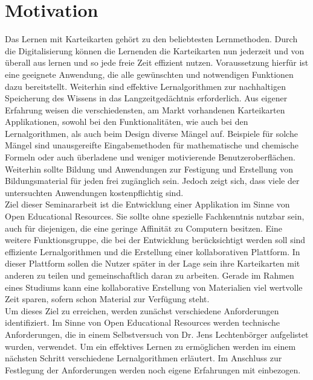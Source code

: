 %
%

\section{Motivation}
Das Lernen mit Karteikarten gehört zu den beliebtesten Lernmethoden. Durch die Digitalisierung können die Lernenden die Karteikarten nun jederzeit und von überall aus lernen und so jede freie Zeit effizient nutzen. Voraussetzung hierfür ist eine geeignete Anwendung, die alle gewünschten und notwendigen Funktionen dazu bereitstellt. Weiterhin sind effektive Lernalgorithmen zur nachhaltigen Speicherung des Wissens in das Langzeitgedächtnis erforderlich. Aus eigener Erfahrung weisen die verschiedensten, am Markt vorhandenen Karteikarten Applikationen, sowohl bei den Funktionalitäten, wie auch bei den Lernalgorithmen, als auch beim Design diverse Mängel auf. Beispiele für solche Mängel sind unausgereifte Eingabemethoden für mathematische und chemische Formeln oder auch überladene und weniger motivierende Benutzeroberflächen. Weiterhin sollte Bildung und Anwendungen zur Festigung und Erstellung von Bildungsmaterial für jeden frei zugänglich sein. Jedoch zeigt sich, dass viele der untersuchten Anwendungen kostenpflichtig sind.\\

Ziel dieser Seminararbeit ist die Entwicklung einer Applikation im Sinne von Open Educational Resources. Sie sollte ohne spezielle Fachkenntnis nutzbar sein, auch für diejenigen, die eine geringe Affinität zu Computern besitzen. Eine weitere Funktionsgruppe, die bei der Entwicklung berücksichtigt werden soll sind effiziente Lernalgorithmen und die Erstellung einer kollaborativen Plattform. In dieser Plattform sollen die Nutzer später in der Lage sein ihre Karteikarten mit anderen zu teilen und gemeinschaftlich daran zu arbeiten. Gerade im Rahmen eines Studiums kann eine kollaborative Erstellung von Materialien viel wertvolle Zeit sparen, sofern schon Material zur Verfügung steht. \\

Um dieses Ziel zu erreichen, werden zunächst verschiedene Anforderungen identifiziert. Im Sinne von Open Educational Resources werden technische Anforderungen, die in einem Selbstversuch von Dr. Jens Lechtenbörger aufgelistet wurden, verwendet. Um ein effektives Lernen zu ermöglichen werden im einem nächsten Schritt verschiedene Lernalgorithmen erläutert. Im Anschluss zur Festlegung der Anforderungen werden noch eigene Erfahrungen mit einbezogen.

